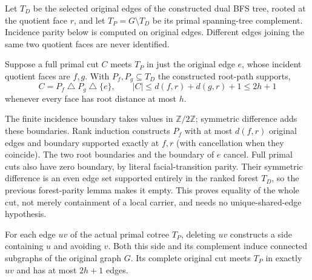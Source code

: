 Let $T_D$ be the selected original edges of the constructed dual BFS
tree, rooted at the quotient face $r$, and let $T_P=G\setminus T_D$ be
its primal spanning-tree complement.  Incidence parity below is computed
on original edges.  Different edges joining the same two quotient faces
are never identified.

\begin{theorem}
Suppose a full primal cut $C$ meets $T_P$ in just the original edge $e$,
whose incident quotient faces are $f,g$.  With $P_f,P_g\subseteq T_D$
the constructed root-path supports,
\[
 C=P_f\mathbin{\triangle}P_g\mathbin{\triangle}\{e\},
 \qquad |C|\leq d(f,r)+d(g,r)+1\leq 2h+1
\]
whenever every face has root distance at most $h$.
\end{theorem}

The finite incidence boundary takes values in $\mathbb Z/2\mathbb Z$;
symmetric difference adds these boundaries.  Rank induction constructs
$P_f$ with at most $d(f,r)$ original edges and boundary supported exactly
at $f,r$ (with cancellation when they coincide).  The two root boundaries
and the boundary of $e$ cancel.  Full primal cuts also have zero boundary,
by literal facial-transition parity.  Their symmetric difference is an
even edge set supported entirely in the ranked forest $T_D$, so the
previous forest-parity lemma makes it empty.  This proves equality of
the whole cut, not merely containment of a local carrier, and needs no
unique-shared-edge hypothesis.

\begin{theorem}
For each edge $uv$ of the actual primal cotree $T_P$, deleting $uv$
constructs a side containing $u$ and avoiding $v$.  Both this side and its
complement induce connected subgraphs of the original graph $G$.  Its
complete original cut meets $T_P$ in exactly $uv$ and has at most $2h+1$
edges.
\end{theorem}

